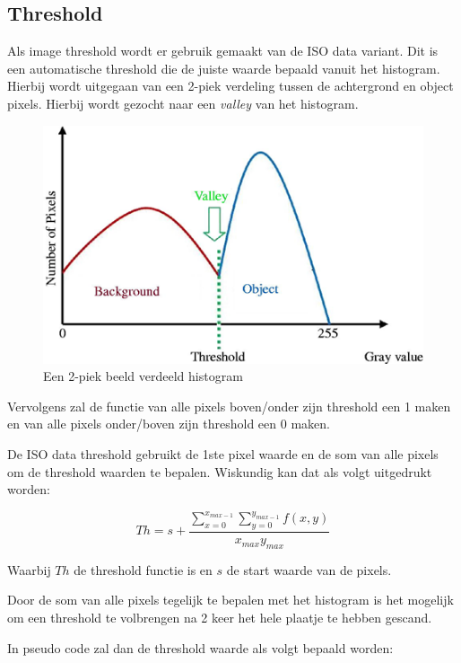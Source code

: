\subsection{Threshold}

Als image threshold wordt er gebruik gemaakt van de ISO data variant. Dit is een
automatische threshold die de juiste waarde bepaald vanuit het histogram. Hierbij
wordt uitgegaan van een 2-piek verdeling tussen de achtergrond en object pixels.
Hierbij wordt gezocht naar een \emph{valley} van het histogram.

\begin{figure}
    \begin{center}
        \includegraphics[scale=0.35]{figures/histogram.png}
    \end{center}
    \caption{Een 2-piek beeld verdeeld histogram}
    \label{fig:histogram}
\end{figure}

Vervolgens zal de functie van alle pixels boven/onder zijn threshold een 1 maken
en van alle pixels onder/boven zijn threshold een 0 maken.

De ISO data threshold gebruikt de 1ste pixel waarde en de som van alle pixels om
de threshold waarden te bepalen. Wiskundig kan dat als volgt uitgedrukt worden:

\[ Th = s + \frac{\sum\limits_{x=0}^{x_{max-1}} \sum\limits_{y=0}^{y_{max-1}} f(x, y)}{x_{max} y_{max}} \]

Waarbij $Th$ de threshold functie is en $s$ de start waarde van de pixels.

Door de som van alle pixels tegelijk te bepalen met het histogram is het
mogelijk om een threshold te volbrengen na 2 keer het hele plaatje te hebben
gescand.

In pseudo code zal dan de threshold waarde als volgt bepaald worden:

